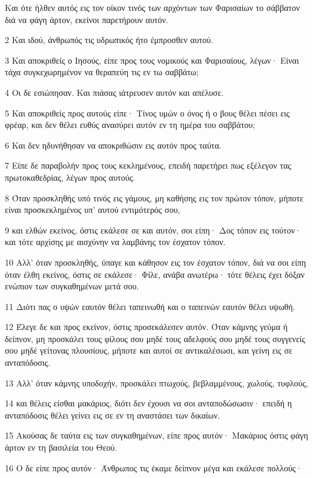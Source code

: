 \par Και ότε ήλθεν αυτός εις τον οίκον τινός των αρχόντων των Φαρισαίων το σάββατον διά να φάγη άρτον, εκείνοι παρετήρουν αυτόν.
\par 2 Και ιδού, άνθρωπός τις υδρωπικός ήτο έμπροσθεν αυτού.
\par 3 Και αποκριθείς ο Ιησούς, είπε προς τους νομικούς και Φαρισαίους, λέγων· Είναι τάχα συγκεχωρημένον να θεραπεύη τις εν τω σαββάτω;
\par 4 Οι δε εσιώπησαν. Και πιάσας ιάτρευσεν αυτόν και απέλυσε.
\par 5 Και αποκριθείς προς αυτούς είπε· Τίνος υμών ο όνος ή ο βους θέλει πέσει εις φρέαρ, και δεν θέλει ευθύς ανασύρει αυτόν εν τη ημέρα του σαββάτου;
\par 6 Και δεν ηδυνήθησαν να αποκριθώσιν εις αυτόν προς ταύτα.
\par 7 Είπε δε παραβολήν προς τους κεκλημένους, επειδή παρετήρει πως εξέλεγον τας πρωτοκαθεδρίας, λέγων προς αυτούς.
\par 8 Όταν προσκληθής υπό τινός εις γάμους, μη καθήσης εις τον πρώτον τόπον, μήποτε είναι προσκεκλημένος υπ' αυτού εντιμότερός σου,
\par 9 και ελθών εκείνος, όστις εκάλεσε σε και αυτόν, σοι είπη· Δος τόπον εις τούτον· και τότε αρχίσης με αισχύνην να λαμβάνης τον έσχατον τόπον.
\par 10 Αλλ' όταν προσκληθής, ύπαγε και κάθησον εις τον έσχατον τόπον, διά να σοι είπη όταν έλθη εκείνος, όστις σε εκάλεσε· Φίλε, ανάβα ανωτέρω· τότε θέλεις έχει δόξαν ενώπιον των συγκαθημένων μετά σου.
\par 11 Διότι πας ο υψών εαυτόν θέλει ταπεινωθή και ο ταπεινών εαυτόν θέλει υψωθή.
\par 12 Έλεγε δε και προς εκείνον, όστις προσεκάλεσεν αυτόν. Όταν κάμνης γεύμα ή δείπνον, μη προσκάλει τους φίλους σου μηδέ τους αδελφούς σου μηδέ τους συγγενείς σου μηδέ γείτονας πλουσίους, μήποτε και αυτοί σε αντικαλέσωσι, και γείνη εις σε ανταπόδοσις.
\par 13 Αλλ' όταν κάμνης υποδοχήν, προσκάλει πτωχούς, βεβλαμμένους, χωλούς, τυφλούς,
\par 14 και θέλεις είσθαι μακάριος, διότι δεν έχουσι να σοι ανταποδώσωσιν· επειδή η ανταπόδοσις θέλει γείνει εις σε εν τη αναστάσει των δικαίων.
\par 15 Ακούσας δε ταύτα εις των συγκαθημένων, είπε προς αυτόν· Μακάριος όστις φάγη άρτον εν τη βασιλεία του Θεού.
\par 16 Ο δε είπε προς αυτόν· Άνθρωπος τις έκαμε δείπνον μέγα και εκάλεσε πολλούς·
